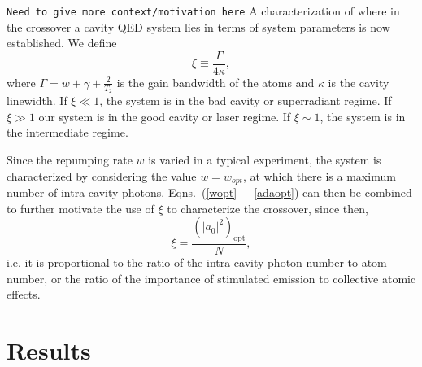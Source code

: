 \documentclass[aps,prl,twocolumn,
superscriptaddress,groupedaddress]{revtex4}
\newcommand{\dmcomment}[1]{{\tt #1}}
\begin{document}
\dmcomment{Need to give more context/motivation here}
A characterization of where in the crossover a cavity QED system lies in
terms of system parameters is now established. We define
\begin{equation}
\xi\equiv\frac{ \Gamma}{4\kappa},
\label{CrossoverParameter}
\end{equation}
where $\Gamma = w+\gamma+\frac{2}{T_2}$ is the gain bandwidth of the
atoms and $\kappa$ is the cavity linewidth. If $\xi\ll1$, the system is
in the bad cavity or superradiant regime. If $\xi\gg1$ our system is in
the good cavity or laser regime. If $\xi\sim1$, the system is in the
intermediate regime.

Since the repumping rate $w$ is varied in a typical experiment, the
system is characterized by considering the value $w=w_{opt}$, at which
there is a maximum number of intra-cavity photons.
Eqns.~(\ref{wopt}~--~\ref{adaopt}) can then be combined to further
motivate the use of $\xi$ to characterize the crossover, since then,
\begin{equation}
\xi = \frac{(|a_0|^2)_{\mathrm{opt}}}{N},
\end{equation}
i.e. it is proportional to the ratio of the intra-cavity photon number
to atom number, or the ratio of the importance of stimulated emission to
collective atomic effects.


\section{Results}
\end{document}
